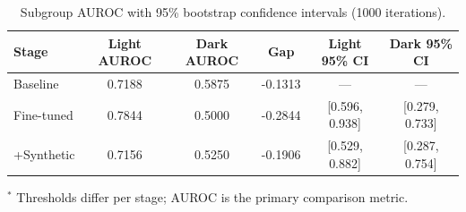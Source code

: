 \begin{table}[htbp]
\centering
\caption{Subgroup AUROC with 95\% bootstrap confidence intervals (1000 iterations).}
\label{tab:subgroup_auroc}
\begin{tabular}{lccccc}
\toprule
\textbf{Stage} & Light AUROC & Dark AUROC & Gap & Light 95\% CI & Dark 95\% CI \\
\midrule
Baseline & 0.7188 & 0.5875 & -0.1313 & --- & --- \\
Fine-tuned & 0.7844 & 0.5000 & -0.2844 & [0.596, 0.938] & [0.279, 0.733] \\
+Synthetic & 0.7156 & 0.5250 & -0.1906 & [0.529, 0.882] & [0.287, 0.754] \\
\bottomrule
\end{tabular}
\vspace{2pt}
\small{$^*$ Thresholds differ per stage; AUROC is the primary comparison metric.}
\end{table}
